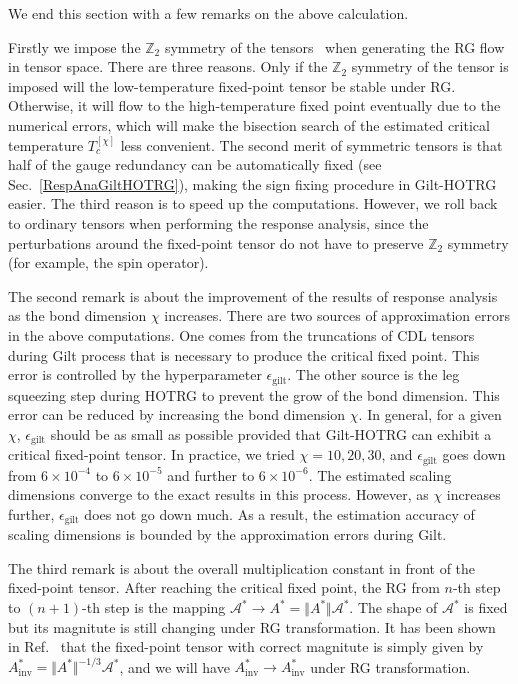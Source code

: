 \documentclass[aps,prb,reprint,superscriptaddress]{revtex4-2}
\begin{document}
We end this section with a few remarks on the above calculation. 
%

Firstly we impose the $\mathbb{Z}_2$ symmetry of the
tensors~\cite{Singh2010SymTen, Singh2011U1Ten} when generating the RG
flow in tensor space. There are three reasons. Only if the
$\mathbb{Z}_2$ symmetry of the tensor is imposed will the
low-temperature fixed-point tensor be stable under RG.  Otherwise, it
will flow to the high-temperature fixed point eventually due to the
numerical errors, which will make the bisection search of the estimated
critical temperature $T_c^{[\chi]}$ less convenient. The second merit of
symmetric tensors is that half of the gauge redundancy can be
automatically fixed (see Sec.~\ref{RespAnaGiltHOTRG}), making the sign
fixing procedure in Gilt-HOTRG easier. The third reason is to speed up
the computations. However, we roll back to ordinary tensors when
performing the response analysis, since the perturbations around the
fixed-point tensor do not have to preserve $\mathbb{Z}_2$ symmetry (for
example, the spin operator). 
%

The second remark is about the improvement of the results of response
analysis as the bond dimension $\chi$ increases. There are two sources
of approximation errors in the above computations. One comes from the
truncations of CDL tensors during Gilt process that is necessary to
produce the critical fixed point. This error is controlled by the
hyperparameter $\epsilon_{\text{gilt}}$. The other source is the leg
squeezing step during HOTRG to prevent the grow of the bond dimension.
This error can be reduced by increasing the bond dimension $\chi$. In
general, for a given $\chi$, $\epsilon_{\text{gilt}}$ should be as small
as possible provided that Gilt-HOTRG can exhibit a critical fixed-point
tensor. In practice, we tried $\chi = 10, 20, 30$, and
$\epsilon_{\text{gilt}}$ goes down from $6\times 10^{-4}$ to
$6\times10^{-5}$ and further to $6\times10^{-6}$.  The estimated scaling
dimensions converge to the exact results in this process. However, as
$\chi$ increases further, $\epsilon_{\text{gilt}}$ does not go down
much. As a result, the estimation accuracy of scaling dimensions is
bounded by the approximation errors during Gilt. 
%

The third remark is about the overall multiplication constant in front
of the fixed-point tensor. After reaching the critical fixed point, the
RG from $n$-th step to $(n+1)$-th step is the mapping
$\mathcal{A}^{*}\rightarrow A^{*} = \Vert A^{*} \Vert
\mathcal{A}^{*}$. The shape of $\mathcal{A}^*$ is fixed but its
magnitute is still changing under RG transformation. It has been shown
in Ref.~\cite{GuWen2009} that the fixed-point tensor with correct
magnitute is simply given by $A^*_{\text{inv}} = \Vert A^* \Vert^{-1/3}
\mathcal{A}^*$, and we will have $A^*_{\text{inv}}\rightarrow
A^*_{\text{inv}}$ under RG transformation.
%
\end{document}
